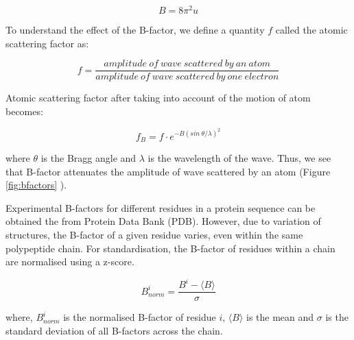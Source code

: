 \begin{equation}
    B = 8\pi^2 u
    \label{eqn:bfactor}
\end{equation}

To understand the effect of the B-factor, we define a quantity $f$ called the atomic scattering factor as:

\begin{equation}
    f = \frac{amplitude\ of\ wave\ scattered\ by\ an\ atom}{amplitude\ of\ wave\ scattered\ by\ one\ electron}
\end{equation}

Atomic scattering factor after taking into account of the motion of atom becomes:

\begin{equation}
    f_B = f\cdot e^{-B(sin\ \theta /\lambda)^2}
\end{equation}

where $\theta$ is the Bragg angle and $\lambda$ is the wavelength of the wave. Thus, we see that B-factor attenuates the amplitude of wave scattered by an atom (Figure \ref{fig:bfactors} ).


Experimental B-factors for different residues in a protein sequence can be obtained the from Protein Data Bank (PDB). However, due to variation of structures, the B-factor of a given residue varies, even within the same polypeptide chain. For standardisation, the B-factor of residues within a chain are normalised using a z-score.

\begin{equation}
    B_{norm}^i =  \frac{B^i - \langle B\rangle}{\sigma}
\end{equation}

where, $B_{norm}^i$ is the normalised B-factor of residue $i$, $\langle B\rangle$ is the mean and $\sigma$ is the standard deviation of all B-factors across the chain.

